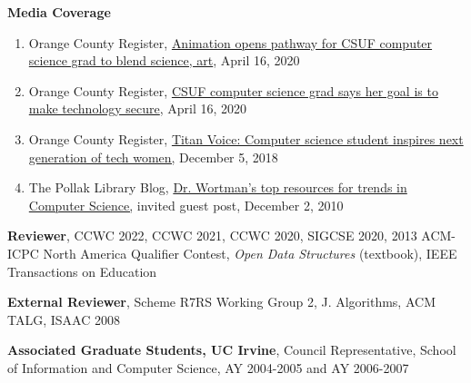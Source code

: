 \documentclass[11pt]{letter}
\begin{document}
\textbf{Media Coverage}
\begin{enumerate}
\item Orange County Register, \href{https://www.ocregister.com/2020/04/16/animation-opens-pathway-for-csuf-computer-science-grad-to-blend-science-and-art/}{Animation opens pathway for CSUF computer science grad to blend science, art}, April 16, 2020
\item Orange County Register, \href{https://www.ocregister.com/2020/04/16/csuf-computer-science-grad-says-her-goal-is-to-make-technology-secure/}{CSUF computer science grad says her goal is to make technology secure}, April 16, 2020
\item Orange County Register, \href{https://www.ocregister.com/2018/12/05/titan-voice-computer-science-student-inspires-next-generation-of-tech-women/}{Titan Voice: Computer science student inspires next generation of tech women,} December 5, 2018
\item The Pollak Library Blog, \href{http://libphp2006.fullerton.edu/blogs/news/2010/12/02/dr-wortmans-top-resources-for-trends-in-computer-science/}{Dr. Wortman's top resources for trends in Computer Science,} invited guest post, December 2, 2010
\end{enumerate}

\textbf{Reviewer}, CCWC 2022, CCWC 2021, CCWC 2020, SIGCSE 2020, 2013 ACM-ICPC North America Qualifier Contest, \emph{Open Data Structures} (textbook), IEEE Transactions on Education

\textbf{External Reviewer}, Scheme R7RS Working Group 2, J. Algorithms, ACM TALG, ISAAC 2008



\textbf{Associated Graduate Students, UC Irvine},  Council Representative, School of Information and Computer Science, AY 2004-2005 and AY 2006-2007 
\end{document}
